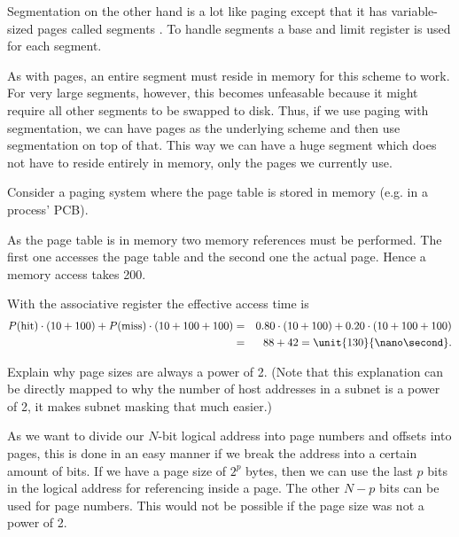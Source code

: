\documentclass[a4paper]{miunasgn}
\begin{document}
\begin{questions}
\begin{solution}
		Segmentation on the other hand is a lot like paging except that it has 
		variable-sized pages called segments \citep[sec.  
		8.6.1]{Silberschatz2009osc}.
		To handle segments a base and limit register is used for each segment.

		As with pages, an entire segment must reside in memory for this scheme to 
		work.
		For very large segments, however, this becomes unfeasable because it might 
		require all other segments to be swapped to disk.
		Thus, if we use paging with segmentation, we can have pages as the 
		underlying scheme and then use segmentation on top of that.
		This way we can have a huge segment which does not have to reside entirely 
		in memory, only the pages we currently use.
	\end{solution}

	\question\label{q:accesstime}
	Consider a paging system where the page table is stored in memory (e.g. in 
	a process' PCB).
	\begin{solution}
		As the page table is in memory two memory references must be performed.
		The first one accesses the page table and the second one the actual page.
		Hence a memory access takes \unit{200}{\nano\second}.

		With the associative register the effective access time is
		\begin{eqnarray}
			P(\text{hit})\cdot (10+100) + P(\text{miss})\cdot (10+100+100) &=&
				0.80\cdot (10+100) + 0.20\cdot (10+100+100) \\
			&=& 88 + 42 = \unit{130}{\nano\second}.
		\end{eqnarray}
	\end{solution}

	\question\label{q:pagesize}
	Explain why page sizes are always a power of 2.
	(Note that this explanation can be directly mapped to why the number of host 
	addresses in a subnet is a power of 2, it makes subnet masking that much 
	easier.)
	\begin{solution}
		As we want to divide our \(N\)-bit logical address into page numbers and 
		offsets into pages, this is done in an easy manner if we break the address 
		into a certain amount of bits.
		If we have a page size of \(2^p\) bytes, then we can use the last \(p\) 
		bits in the logical address for referencing inside a page.
		The other \(N-p\) bits can be used for page numbers.
		This would not be possible if the page size was not a power of 2.


\end{solution}
\end{questions}
\end{document}
